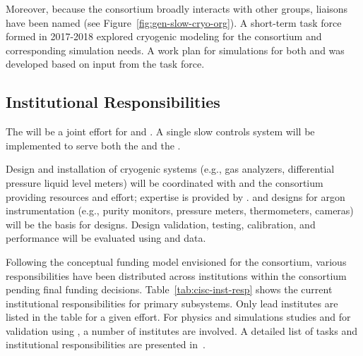 Moreover, because the  consortium broadly interacts with other groups, liaisons have been named (see Figure~\ref{fig:gen-slow-cryo-org}). 
A short-term task force formed in 2017-2018 explored cryogenic modeling for the consortium and corresponding simulation needs. A work plan for  simulations for both  and  was developed based on input from the task force. 


\subsection{Institutional Responsibilities}
The  %
will be a joint effort for \single and \dual. A single slow controls system will be implemented to serve both the  and the .

Design and installation of cryogenic systems (e.g., gas analyzers, differential pressure liquid level meters) will be coordinated with  and the consortium providing resources and effort; expertise is provided by .  and  designs for argon instrumentation (e.g., purity monitors, pressure meters, thermometers, cameras) will be the basis for  designs. Design validation, testing, calibration, and performance will be evaluated using  and  data.

Following the conceptual funding model envisioned for the consortium, various responsibilities have been distributed across institutions within the consortium pending final funding decisions.
Table~\ref{tab:cisc-inst-resp} shows the current institutional responsibilities for primary  subsystems. Only lead institutes are listed in the table for a given effort. For physics and simulations studies and for validation using , a number of institutes are involved. A detailed list of tasks and institutional responsibilities are presented in~\cite{bib:docdb5609}.

